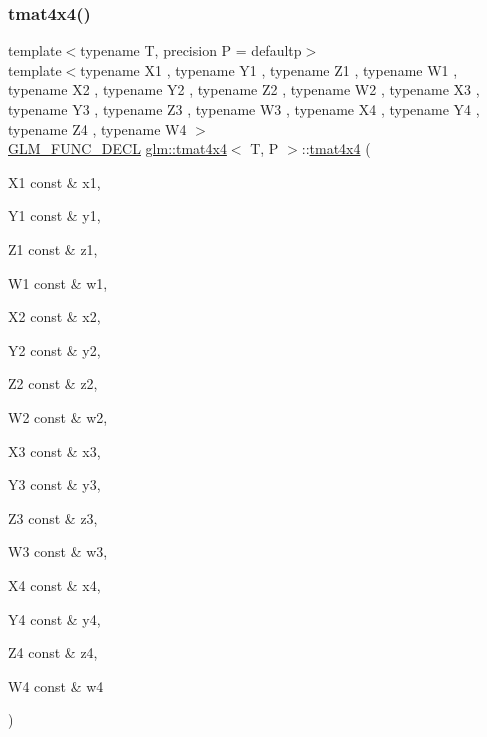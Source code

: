 \subsubsection{\texorpdfstring{tmat4x4()}{tmat4x4()}\hspace{0.1cm}{\footnotesize\ttfamily [8/22]}}
{\footnotesize\ttfamily template$<$typename T, precision P = defaultp$>$ \\
template$<$typename X1 , typename Y1 , typename Z1 , typename W1 , typename X2 , typename Y2 , typename Z2 , typename W2 , typename X3 , typename Y3 , typename Z3 , typename W3 , typename X4 , typename Y4 , typename Z4 , typename W4 $>$ \\
\mbox{\hyperlink{setup_8hpp_ab2d052de21a70539923e9bcbf6e83a51}{G\+L\+M\+\_\+\+F\+U\+N\+C\+\_\+\+D\+E\+CL}} \mbox{\hyperlink{structglm_1_1tmat4x4}{glm\+::tmat4x4}}$<$ T, P $>$\+::\mbox{\hyperlink{structglm_1_1tmat4x4}{tmat4x4}} (\begin{DoxyParamCaption}\item[{X1 const \&}]{x1,  }\item[{Y1 const \&}]{y1,  }\item[{Z1 const \&}]{z1,  }\item[{W1 const \&}]{w1,  }\item[{X2 const \&}]{x2,  }\item[{Y2 const \&}]{y2,  }\item[{Z2 const \&}]{z2,  }\item[{W2 const \&}]{w2,  }\item[{X3 const \&}]{x3,  }\item[{Y3 const \&}]{y3,  }\item[{Z3 const \&}]{z3,  }\item[{W3 const \&}]{w3,  }\item[{X4 const \&}]{x4,  }\item[{Y4 const \&}]{y4,  }\item[{Z4 const \&}]{z4,  }\item[{W4 const \&}]{w4 }\end{DoxyParamCaption})}

\mbox{\label{structglm_1_1tmat4x4_a2e88247f4e213492fc372edce3c226a2}} 
